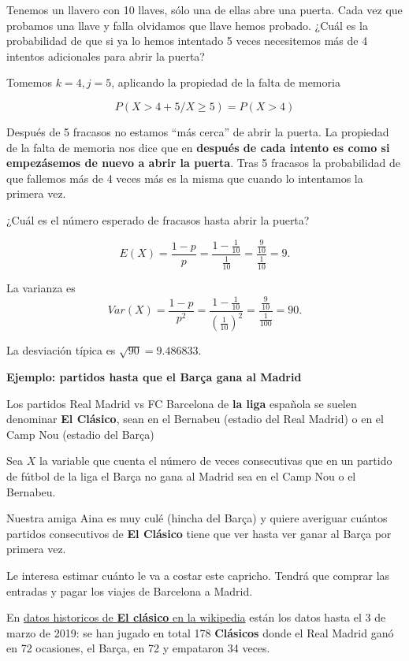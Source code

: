 \documentclass[]{book}
\begin{document}
Tenemos un llavero con 10 llaves, sólo una de ellas abre una puerta. Cada vez que probamos una llave y falla olvidamos que llave hemos probado. ¿Cuál es la probabilidad de que si ya lo hemos intentado 5 veces necesitemos más de 4 intentos adicionales para abrir la puerta?

Tomemos \(k=4,j=5\), aplicando la propiedad de la falta de memoria

\[
P(X> 4+5/X \geq 5)=P(X > 4)
\]

Después de 5 fracasos no estamos ``más cerca'' de abrir la puerta.
La propiedad de la falta de memoria nos dice que en \textbf{después de cada intento es como si empezásemos de nuevo a abrir la puerta}. Tras 5 fracasos la probabilidad de que fallemos más de 4 veces más es la misma que cuando lo intentamos la primera vez.

¿Cuál es el número esperado de fracasos hasta abrir la puerta?

\[
E(X)=\frac{1-p}{p}=\frac{1-\frac{1}{10}}{\frac{1}{10}}=\frac{\frac{9}{10}}{\frac{1}{10}}=9.
\]

La varianza es
\[
Var(X)=\frac{1-p}{p^2}=\frac{1-\frac{1}{10}}{\left(\frac{1}{10}\right)^2}=\frac{\frac{9}{10}}{\frac{1}{100}}=
90.
\]

La desviación típica es \(\sqrt{90}=9.486833.\)

\textbf{Ejemplo: partidos hasta que el Barça gana al Madrid}

Los partidos Real Madrid vs FC Barcelona de \textbf{la liga} española se suelen denominar \textbf{El Clásico}, sean en el Bernabeu (estadio del Real Madrid) o en el Camp Nou (estadio del Barça)

Sea \(X\) la variable que cuenta el número de veces consecutivas que en un partido de fútbol de la liga el Barça no gana al Madrid sea en el Camp Nou o el Bernabeu.

Nuestra amiga Aina es muy culé (hincha del Barça) y quiere averiguar cuántos partidos consecutivos de \textbf{El Clásico} tiene que ver hasta ver ganar al Barça por primera vez.

Le interesa estimar cuánto le va a costar este capricho. Tendrá que comprar las entradas y pagar los viajes de Barcelona a Madrid.

En \href{https://es.wikipedia.org/wiki/El_Cl\%C3\%A1sico}{datos historicos de \textbf{El clásico} en la wikipedia} están los datos hasta el 3 de marzo de 2019: se han jugado en total 178 \textbf{Clásicos} donde el Real Madrid ganó en 72 ocasiones, el Barça, en 72 y empataron 34 veces.
\end{document}
